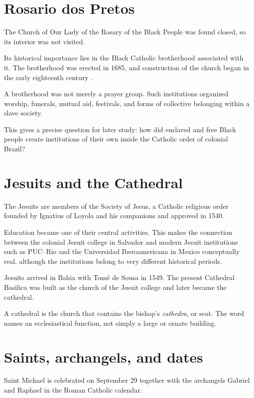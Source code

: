 \section{Rosario dos Pretos}
\label{section-rosario-dos-pretos}

The Church of Our Lady of the Rosary of
the Black People was found closed, so its
interior was not visited.

Its historical importance lies in the
Black Catholic brotherhood associated
with it.  The brotherhood was erected in
1685, and construction of the church began
in the early eighteenth century
\cite{ipac-rosario}.

A brotherhood was not merely a prayer
group.  Such institutions organized
worship, funerals, mutual aid, festivals,
and forms of collective belonging within
a slave society.

This gives a precise question for later
study: how did enslaved and free Black
people create institutions of their own
inside the Catholic order of colonial
Brazil?

\section{Jesuits and the Cathedral}
\label{section-jesuits-cathedral}

The Jesuits are members of the Society of
Jesus, a Catholic religious order founded
by Ignatius of Loyola and his companions
and approved in 1540.

Education became one of their central
activities.  This makes the connection
between the colonial Jesuit college in
Salvador and modern Jesuit institutions
such as PUC--Rio and the Universidad
Iberoamericana in Mexico conceptually
real, although the institutions belong to
very different historical periods.

Jesuits arrived in Bahia with Tom\'e de
Sousa in 1549.  The present Cathedral
Basilica was built as the church of the
Jesuit college and later became the
cathedral.

A cathedral is the church that contains
the bishop's \emph{cathedra}, or seat.  The
word names an ecclesiastical function,
not simply a large or ornate building.

\section{Saints, archangels, and dates}
\label{section-saints-archangels-dates}

Saint Michael is celebrated on September
29 together with the archangels Gabriel
and Raphael in the Roman Catholic
calendar.

